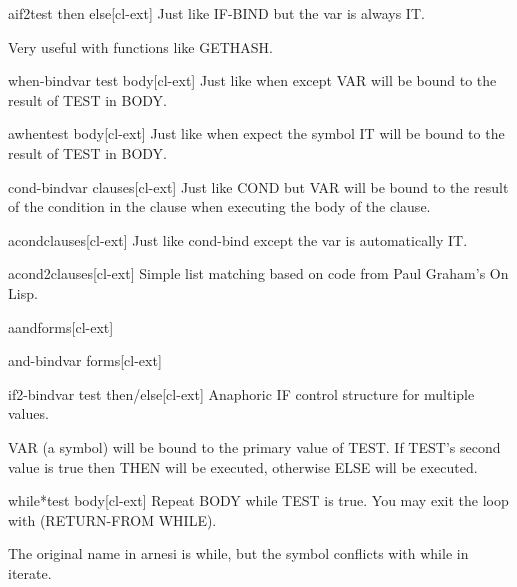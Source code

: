 \documentclass[10pt,english]{book}
\begin{document}
\begin{macro}{aif2}{test then \op else}[cl-ext]
  Just like IF-BIND but the var is always IT.

Very useful with functions like GETHASH.
\end{macro}

\begin{macro}{when-bind}{var test \body body}[cl-ext]
  Just like when except VAR will be bound to the
  result of TEST in BODY.
\end{macro}

\begin{macro}{awhen}{test \body body}[cl-ext]
  Just like when expect the symbol IT will be
  bound to the result of TEST in BODY.
\end{macro}

\begin{macro}{cond-bind}{var \body clauses}[cl-ext]
  Just like COND but VAR will be bound to the result of the
  condition in the clause when executing the body of the clause.
\end{macro}

\begin{macro}{acond}{\rest clauses}[cl-ext]
  Just like cond-bind except the var is automatically IT.
\end{macro}

\begin{macro}{acond2}{\rest clauses}[cl-ext]
  Simple list matching based on code from Paul Graham's On Lisp.
\end{macro}

\begin{macro}{aand}{\rest forms}[cl-ext]
  
\end{macro}

\begin{macro}{and-bind}{var \rest forms}[cl-ext]
  
\end{macro}

\begin{macro}{if2-bind}{var test \body then/else}[cl-ext]
  Anaphoric IF control structure for multiple values.

VAR (a symbol) will be bound to the primary value of TEST.  If
TEST's second value is true then THEN will be executed, otherwise
ELSE will be executed.
\end{macro}

\begin{macro}{while*}{test \body body}[cl-ext]
  Repeat BODY while TEST is true. You may exit the loop with
  (RETURN-FROM WHILE).
  \begin{devnote}
    The original name in arnesi is while, but the symbol conflicts
    with while in iterate.
  \end{devnote}
\end{macro}
\end{document}
